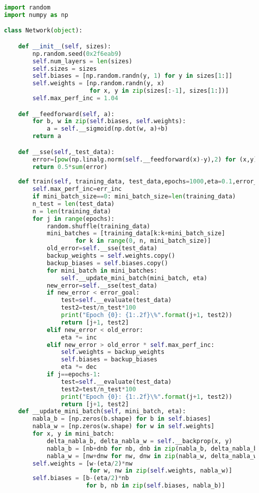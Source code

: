 \documentclass[12pt,twoside]{article}
\begin{document}
\begin{lstlisting}[language=Python,caption=Implementacja sieci,label={Kod2}]
import random
import numpy as np

class Network(object):

    def __init__(self, sizes):
        np.random.seed(0x2f6eab9)
        self.num_layers = len(sizes)
        self.sizes = sizes
        self.biases = [np.random.randn(y, 1) for y in sizes[1:]]
        self.weights = [np.random.randn(y, x)
                        for x, y in zip(sizes[:-1], sizes[1:])]
        self.max_perf_inc = 1.04

    def __feedforward(self, a):
        for b, w in zip(self.biases, self.weights):
            a = self.__sigmoid(np.dot(w, a)+b)
        return a

    def __sse(self,_test_data):
        error=[pow(np.linalg.norm(self.__feedforward(x)-y),2) for (x,y) in _test_data]
        return 0.5*sum(error)    
 
    def train(self, training_data, test_data,epochs=1000,eta=0.1,error_goal=0.25,inc=1.05,dec=0.7,mini_batch_size=0,err_inc=1.04):
        self.max_perf_inc=err_inc
        if mini_batch_size==0: mini_batch_size=len(training_data)
        n_test = len(test_data)
        n = len(training_data)
        for j in range(epochs):
            random.shuffle(training_data)
            mini_batches = [training_data[k:k+mini_batch_size]
                    for k in range(0, n, mini_batch_size)]
            old_error=self.__sse(test_data)
            backup_weights = self.weights.copy()
            backup_biases = self.biases.copy()
            for mini_batch in mini_batches:
                self.__update_mini_batch(mini_batch, eta)
            new_error=self.__sse(test_data)
            if new_error < error_goal:
                test=self.__evaluate(test_data)
                test2=test/n_test*100
                print("Epoch {0}: {1:.2f}\%".format(j+1, test2))
                return [j+1, test2]
            elif new_error < old_error:
                eta *= inc
            elif new_error > old_error * self.max_perf_inc:
                self.weights = backup_weights
                self.biases = backup_biases
                eta *= dec
            if j==epochs-1:
                test=self.__evaluate(test_data)
                test2=test/n_test*100
                print("Epoch {0}: {1:.2f}\%".format(j+1, test2))
                return [j+1, test2]
    def __update_mini_batch(self, mini_batch, eta):
        nabla_b = [np.zeros(b.shape) for b in self.biases]
        nabla_w = [np.zeros(w.shape) for w in self.weights]
        for x, y in mini_batch:
            delta_nabla_b, delta_nabla_w = self.__backprop(x, y)
            nabla_b = [nb+dnb for nb, dnb in zip(nabla_b, delta_nabla_b)]
            nabla_w = [nw+dnw for nw, dnw in zip(nabla_w, delta_nabla_w)]
        self.weights = [w-(eta/2)*nw
                        for w, nw in zip(self.weights, nabla_w)]
        self.biases = [b-(eta/2)*nb
                       for b, nb in zip(self.biases, nabla_b)]


\end{lstlisting}
\end{document}
